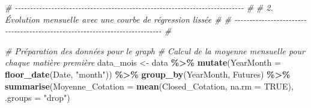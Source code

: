 \documentclass[
]{article}
\newenvironment{Shaded}{\begin{snugshade}}{\end{snugshade}}
\newcommand{\AttributeTok}[1]{\textcolor[rgb]{0.13,0.29,0.53}{#1}}
\newcommand{\CommentTok}[1]{\textcolor[rgb]{0.56,0.35,0.01}{\textit{#1}}}
\newcommand{\ConstantTok}[1]{\textcolor[rgb]{0.56,0.35,0.01}{#1}}
\newcommand{\FunctionTok}[1]{\textcolor[rgb]{0.13,0.29,0.53}{\textbf{#1}}}
\newcommand{\NormalTok}[1]{#1}
\newcommand{\OtherTok}[1]{\textcolor[rgb]{0.56,0.35,0.01}{#1}}
\newcommand{\SpecialCharTok}[1]{\textcolor[rgb]{0.81,0.36,0.00}{\textbf{#1}}}
\newcommand{\StringTok}[1]{\textcolor[rgb]{0.31,0.60,0.02}{#1}}
\begin{document}
\begin{Shaded}
\begin{Highlighting}[]
\CommentTok{\# {-}{-}{-}{-}{-}{-}{-}{-}{-}{-}{-}{-}{-}{-}{-}{-}{-}{-}{-}{-}{-}{-}{-}{-}{-}{-}{-}{-}{-}{-}{-}{-}{-}{-}{-}{-}{-}{-}{-}{-}{-}{-}{-}{-}{-}{-}{-}{-}{-}{-}{-}{-}{-}{-}{-}{-}{-}{-}{-}{-}{-}{-}{-}{-}{-}{-}{-}{-}{-}{-}{-}{-}{-}{-}{-}{-} \#}
\CommentTok{\#     2. Évolution mensuelle avec une courbe de régression lissée              \# }
\CommentTok{\# {-}{-}{-}{-}{-}{-}{-}{-}{-}{-}{-}{-}{-}{-}{-}{-}{-}{-}{-}{-}{-}{-}{-}{-}{-}{-}{-}{-}{-}{-}{-}{-}{-}{-}{-}{-}{-}{-}{-}{-}{-}{-}{-}{-}{-}{-}{-}{-}{-}{-}{-}{-}{-}{-}{-}{-}{-}{-}{-}{-}{-}{-}{-}{-}{-}{-}{-}{-}{-}{-}{-}{-}{-}{-}{-}{-} \#}

\CommentTok{\# Préparation des données pour le graph}
\CommentTok{\# Calcul de la moyenne mensuelle pour chaque matière première}
\NormalTok{data\_mois }\OtherTok{\textless{}{-}}\NormalTok{ data }\SpecialCharTok{\%\textgreater{}\%}
  \FunctionTok{mutate}\NormalTok{(}\AttributeTok{YearMonth =} \FunctionTok{floor\_date}\NormalTok{(Date, }\StringTok{"month"}\NormalTok{)) }\SpecialCharTok{\%\textgreater{}\%} 
  \FunctionTok{group\_by}\NormalTok{(YearMonth, Futures) }\SpecialCharTok{\%\textgreater{}\%} 
  \FunctionTok{summarise}\NormalTok{(}\AttributeTok{Moyenne\_Cotation =} \FunctionTok{mean}\NormalTok{(Closed\_Cotation, }\AttributeTok{na.rm =} \ConstantTok{TRUE}\NormalTok{), }\AttributeTok{.groups =} \StringTok{"drop"}\NormalTok{)}


\end{Highlighting}
\end{Shaded}
\end{document}
